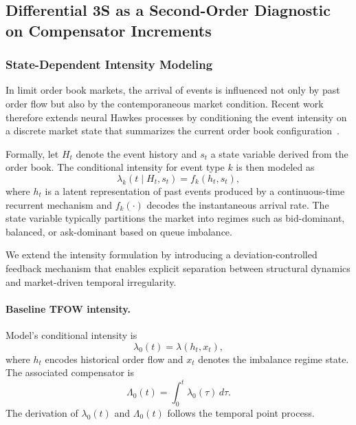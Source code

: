 \subsection{Differential 3S as a Second-Order Diagnostic on Compensator Increments}



\subsubsection{State-Dependent Intensity Modeling}

In limit order book markets, the arrival of events is influenced not only by past order flow but also by the contemporaneous market condition. Recent work therefore extends neural Hawkes processes by conditioning the event intensity on a discrete market state that summarizes the current order book configuration~\cite{Shi2022StateSimulation}. 

Formally, let $H_t$ denote the event history and $s_t$ a state variable derived from the order book. The conditional intensity for event type $k$ is then modeled as
\begin{equation}
\lambda_k(t \mid H_t, s_t) = f_k(h_t, s_t),
\end{equation}
where $h_t$ is a latent representation of past events produced by a continuous-time recurrent mechanism and $f_k(\cdot)$ decodes the instantaneous arrival rate. The state variable typically partitions the market into regimes such as bid-dominant, balanced, or ask-dominant based on queue imbalance.



We extend the intensity formulation by introducing a deviation-controlled feedback mechanism that enables explicit separation between structural dynamics and market-driven temporal irregularity.

\paragraph{Baseline TFOW intensity.}
Model's conditional intensity is
%
\begin{equation}
\lambda_0(t)
=
\lambda(h_t, x_t),
\label{eq:tfow_baseline_intensity2}
\end{equation}
%
where $h_t$ encodes historical order flow and $x_t$ denotes the imbalance regime state. The associated compensator is
%
\begin{equation}
\Lambda_0(t)
=
\int_0^t \lambda_0(\tau)\, d\tau.
\label{eq:tfow_compensator2}
\end{equation}
%
The derivation of $\lambda_0(t)$ and $\Lambda_0(t)$ follows the temporal point process.

